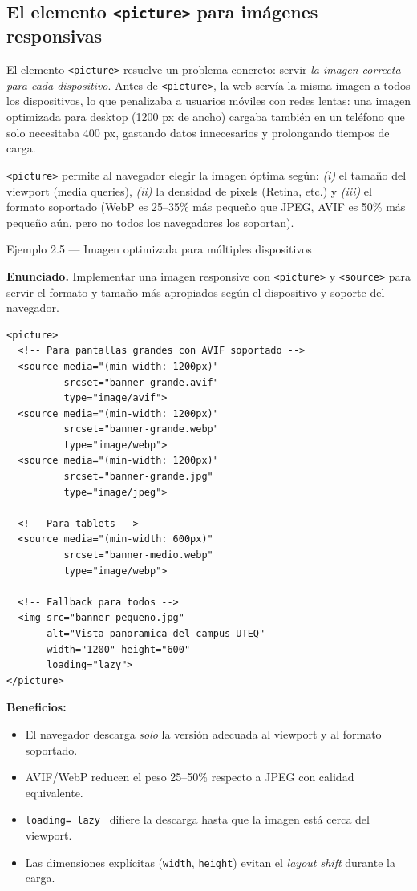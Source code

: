 \documentclass[11pt,a4paper,openany]{book}
\begin{document}
\subsection{El elemento \texttt{<picture>} para imágenes responsivas}

El elemento \texttt{<picture>} resuelve un problema concreto: servir
\emph{la imagen correcta para cada dispositivo}. Antes de
\texttt{<picture>}, la web servía la misma imagen a todos los
dispositivos, lo que penalizaba a usuarios móviles con redes lentas:
una imagen optimizada para desktop (1200 px de ancho) cargaba
también en un teléfono que solo necesitaba 400 px, gastando datos
innecesarios y prolongando tiempos de carga.

\texttt{<picture>} permite al navegador elegir la imagen óptima
según: \emph{(i)} el tamaño del viewport (media queries), \emph{(ii)}
la densidad de pixels (Retina, etc.) y \emph{(iii)} el formato
soportado (WebP es 25--35\% más pequeño que JPEG, AVIF es 50\% más
pequeño aún, pero no todos los navegadores los soportan).

\begin{cajaejemplo}{Ejemplo 2.5 --- Imagen optimizada para múltiples dispositivos}

\textbf{Enunciado.} Implementar una imagen responsive con \texttt{<picture>} y \texttt{<source>} para servir el formato y tamaño más apropiados según el dispositivo y soporte del navegador.

\begin{lstlisting}[style=html,caption={Ejemplo de HTML},label=lst:2.9]
<picture>
  <!-- Para pantallas grandes con AVIF soportado -->
  <source media="(min-width: 1200px)"
          srcset="banner-grande.avif"
          type="image/avif">
  <source media="(min-width: 1200px)"
          srcset="banner-grande.webp"
          type="image/webp">
  <source media="(min-width: 1200px)"
          srcset="banner-grande.jpg"
          type="image/jpeg">

  <!-- Para tablets -->
  <source media="(min-width: 600px)"
          srcset="banner-medio.webp"
          type="image/webp">

  <!-- Fallback para todos -->
  <img src="banner-pequeno.jpg"
       alt="Vista panoramica del campus UTEQ"
       width="1200" height="600"
       loading="lazy">
</picture>
\end{lstlisting}
\textbf{Beneficios:}
\begin{itemize}
\item El navegador descarga \emph{solo} la versión adecuada al
viewport y al formato soportado.
\item AVIF/WebP reducen el peso 25--50\% respecto a JPEG con calidad
equivalente.
\item \texttt{loading= lazy } difiere la descarga hasta que la
imagen está cerca del viewport.
\item Las dimensiones explícitas (\texttt{width}, \texttt{height})
evitan el \emph{layout shift} durante la carga.
\end{itemize}
\end{cajaejemplo}
\end{document}
